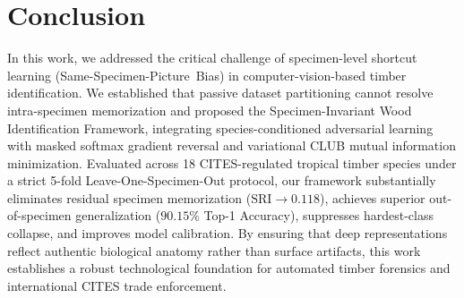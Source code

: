 \documentclass[a4paper,fleqn]{cas-sc}
\begin{document}
\section{Conclusion}
\label{sec:conclusion}
In this work, we addressed the critical challenge of specimen-level shortcut learning (\mbox{Same-Specimen-Picture Bias}) in computer-vision-based timber identification. We established that passive dataset partitioning cannot resolve intra-specimen memorization and proposed the Specimen-Invariant Wood Identification Framework, integrating species-conditioned adversarial learning with masked softmax gradient reversal and variational CLUB mutual information minimization. Evaluated across 18 CITES-regulated tropical timber species under a strict 5-fold Leave-One-Specimen-Out protocol, our framework substantially eliminates residual specimen memorization ($\mathrm{SRI} \to 0.118$), achieves superior out-of-specimen generalization ($90.15\%$ Top-1 Accuracy), suppresses hardest-class collapse, and improves model calibration. By ensuring that deep representations reflect authentic biological anatomy rather than surface artifacts, this work establishes a robust technological foundation for automated timber forensics and international CITES trade enforcement.



\end{document}
